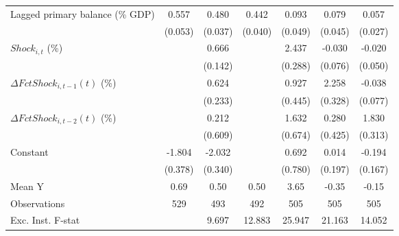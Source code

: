 {\begin{tabular}{l*{6}{c}}
\addlinespace
Lagged primary balance (\% GDP)&       0.557\sym{***}&       0.480\sym{***}&       0.442\sym{***}&       0.093\sym{*}  &       0.079\sym{*}  &       0.057\sym{**} \\
                    &     (0.053)         &     (0.037)         &     (0.040)         &     (0.049)         &     (0.045)         &     (0.027)         \\
\addlinespace
$ Shock_{i,t}$ (\%) &                     &       0.666\sym{***}&                     &       2.437\sym{***}&      -0.030         &      -0.020         \\
                    &                     &     (0.142)         &                     &     (0.288)         &     (0.076)         &     (0.050)         \\
\addlinespace
$ \Delta FctShock_{i,t-1}(t)$ (\%)&                     &       0.624\sym{**} &                     &       0.927\sym{**} &       2.258\sym{***}&      -0.038         \\
                    &                     &     (0.233)         &                     &     (0.445)         &     (0.328)         &     (0.077)         \\
\addlinespace
$ \Delta FctShock_{i,t-2}(t)$ (\%)&                     &       0.212         &                     &       1.632\sym{**} &       0.280         &       1.830\sym{***}\\
                    &                     &     (0.609)         &                     &     (0.674)         &     (0.425)         &     (0.313)         \\
\addlinespace
Constant            &      -1.804\sym{***}&      -2.032\sym{***}&                     &       0.692         &       0.014         &      -0.194         \\
                    &     (0.378)         &     (0.340)         &                     &     (0.780)         &     (0.197)         &     (0.167)         \\
\midrule
Mean Y              &        0.69         &        0.50         &        0.50         &        3.65         &       -0.35         &       -0.15         \\
Observations        &         529         &         493         &         492         &         505         &         505         &         505         \\
Exc. Inst. F-stat   &                     &       9.697         &      12.883         &      25.947         &      21.163         &      14.052         \\
\bottomrule
\end{tabular}
}
